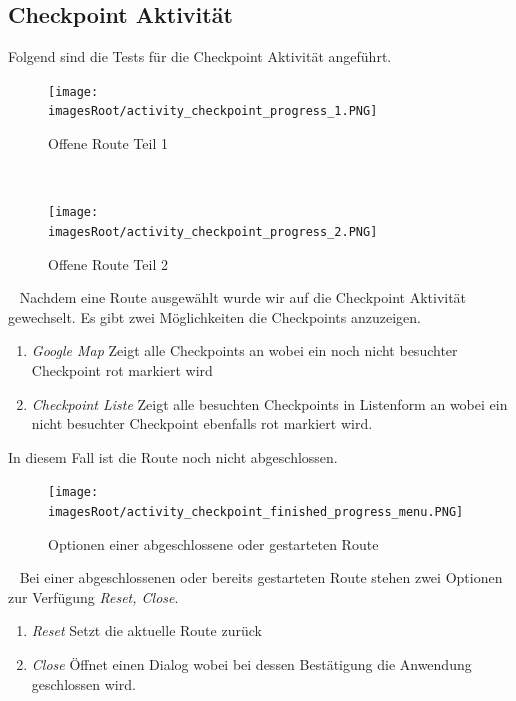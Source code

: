 \documentclass[11pt, a4paper, twoside]{article}   	%
\newcommand{\imagesRoot}{images}
\begin{document}
\subsection{Checkpoint Aktivität}
Folgend sind die Tests für die Checkpoint Aktivität angeführt.
\begin{figure}[h]
	\centering
	\texttt{[image: \\imagesRoot/activity\_checkpoint\_progress\_1.PNG]}
	\caption
	{Offene Route Teil 1}
\end{figure}
\ \newline
\begin{figure}[h]
	\centering
	\texttt{[image: \\imagesRoot/activity\_checkpoint\_progress\_2.PNG]}
	\caption
	{Offene Route Teil 2}
\end{figure}
\ \newline
Nachdem eine Route ausgewählt wurde wir auf die Checkpoint Aktivität gewechselt. Es gibt zwei Möglichkeiten die Checkpoints anzuzeigen.
\begin{enumerate}
	\item\emph{Google Map}
	\newline 
	Zeigt alle Checkpoints an wobei ein noch nicht besuchter Checkpoint rot markiert wird
	\item\emph{Checkpoint Liste}
	\newline 
	Zeigt alle besuchten Checkpoints in Listenform an wobei ein nicht besuchter Checkpoint ebenfalls rot markiert wird.
\end{enumerate}
In diesem Fall ist die Route noch nicht abgeschlossen.
\newpage
\begin{figure}[h]
	\centering
	\texttt{[image: \\imagesRoot/activity\_checkpoint\_finished\_progress\_menu.PNG]}
	\caption
	{Optionen einer abgeschlossene oder gestarteten Route}
\end{figure}
\ \newline
Bei einer abgeschlossenen oder bereits gestarteten Route stehen zwei Optionen zur Verfügung \emph{Reset, Close}.
\begin{enumerate}
	\item\emph{Reset}
	\newline
	Setzt die aktuelle Route zurück
	\item\emph{Close}
	\newline
	Öffnet einen Dialog wobei bei dessen Bestätigung die Anwendung geschlossen wird.
\end{enumerate}
\ \newline
\end{document}
